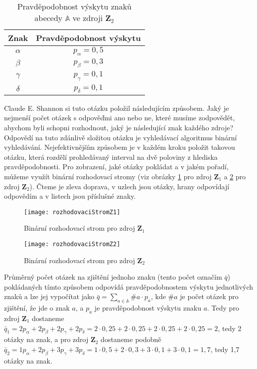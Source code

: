 \begin{table}[!htb]
\centering
\begin{tabular}{|c|c|}
\hline
Znak & Pravděpodobnost výskytu\\
\hline
$\alpha$ & $p_\alpha = 0,5$\\
$\beta$ & $p_\beta = 0,3$\\
$\gamma$ & $p_\gamma = 0,1$\\
$\delta$ & $p_\delta = 0,1$\\
\hline
\end{tabular}
\caption{Pravděpodobnost výskytu znaků abecedy $\mathbb{A}$ ve zdroji $\mathbf{Z}_2$}
\label{pstVyskytu}
\end{table}

Claude E. Shannon si tuto otázku položil následujícím způsobem. Jaký je nejmenší počet otázek s odpověďmi ano nebo ne, které musíme zodpovědět, abychom byli schopni rozhodnout, jaký je následující znak každého zdroje? Odpovědí na tuto zdánlivě složitou otázku je vyhledávací algoritmus binární vyhledávání. Nejefektivnějším způsobem je v každém kroku položit takovou otázku, která rozdělí prohledávaný interval na dvě poloviny z hlediska pravděpodobnosti. Pro zobrazení, jaké otázky pokládat a v jakém pořadí, můžeme využít binární rozhodovací stromy (viz obrázky \ref{rozhodovaciStromZ1} pro zdroj $\mathbf{Z}_1$ a \ref{rozhodovaciStromZ2} pro zdroj $\mathbf{Z}_2$). Čteme je zleva doprava, v uzlech jsou otázky, hrany odpovídají odpovědím a v listech jsou příslušné znaky.

\begin{figure}[!htb]
\centering
\texttt{[image: rozhodovaciStromZ1]}
\caption{Binární rozhodovací strom pro zdroj $\mathbf{Z}_1$}
\label{rozhodovaciStromZ1}
\end{figure}

\begin{figure}[!htb]
\centering
\texttt{[image: rozhodovaciStromZ2]}
\caption{Binární rozhodovací strom pro zdroj $\mathbf{Z}_2$}
\label{rozhodovaciStromZ2}
\end{figure}

Průměrný počet otázek na zjištění jednoho znaku (tento počet označím $\bar{q}$) pokládaných tímto způsobem odpovídá pravděpodobnostem výskytu jednotlivých znaků a lze jej vypočítat jako $\bar{q} = \sum_{a \in \mathbb{A}} \#a \cdot p_a$, kde $\#a$ je počet otázek pro zjištění, že jde o znak $a$, a $p_a$ je pravděpodobnost výskytu znaku $a$. Tedy pro zdroj $\mathbf{Z}_1$ dostaneme $\bar{q}_1 = 2p_\alpha + 2p_\beta + 2p_\gamma + 2p_\delta =2\cdot0,25 + 2\cdot0,25 + 2\cdot0,25 + 2\cdot0,25 = 2$, tedy 2 otázky na znak, a pro zdroj $\mathbf{Z}_2$ dostaneme podobně $\bar{q}_2 = 1p_\alpha + 2p_\beta + 3p_\gamma + 3p_\delta =1\cdot0,5 + 2\cdot0,3 + 3\cdot0,1 + 3\cdot0,1 = 1,7$, tedy 1,7 otázky na znak.

